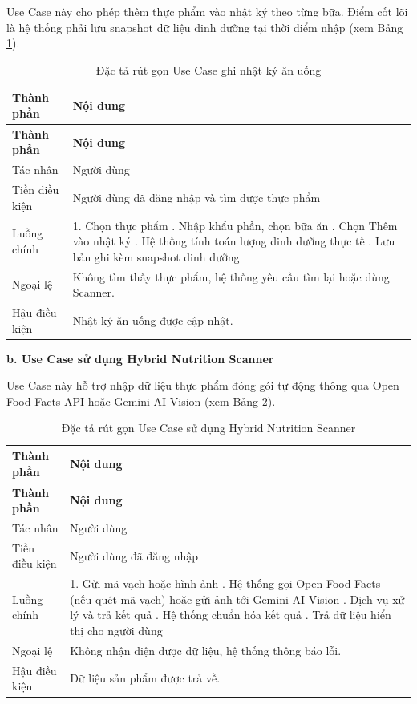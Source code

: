 \documentclass[12pt, a4paper]{report}
\begin{document}
Use Case này cho phép thêm thực phẩm vào nhật ký theo từng bữa. Điểm cốt lõi là hệ thống phải lưu snapshot dữ liệu dinh dưỡng tại thời điểm nhập (xem Bảng \ref{tab:uc_ghi_nhat_ky}).

\begin{longtable}{|>{\raggedright\arraybackslash}p{4cm}|p{11cm}|}
\caption{Đặc tả rút gọn Use Case ghi nhật ký ăn uống}
\label{tab:uc_ghi_nhat_ky} \\
\hline
\textbf{Thành phần} & \textbf{Nội dung} \\
\hline
\endfirsthead
\hline
\textbf{Thành phần} & \textbf{Nội dung} \\
\hline
\endhead

Tác nhân & Người dùng \\
\hline
Tiền điều kiện & Người dùng đã đăng nhập và tìm được thực phẩm \\
\hline
Luồng chính & 1. Chọn thực phẩm \newline 2. Nhập khẩu phần, chọn bữa ăn \newline 3. Chọn Thêm vào nhật ký \newline 4. Hệ thống tính toán lượng dinh dưỡng thực tế \newline 5. Lưu bản ghi kèm snapshot dinh dưỡng \\
\hline
Ngoại lệ & Không tìm thấy thực phẩm, hệ thống yêu cầu tìm lại hoặc dùng Scanner. \\
\hline
Hậu điều kiện & Nhật ký ăn uống được cập nhật. \\
\hline
\end{longtable}

\textbf{b. Use Case sử dụng Hybrid Nutrition Scanner}

Use Case này hỗ trợ nhập dữ liệu thực phẩm đóng gói tự động thông qua Open Food Facts API hoặc Gemini AI Vision (xem Bảng \ref{tab:uc_scanner}).

\begin{longtable}{|>{\raggedright\arraybackslash}p{4cm}|p{11cm}|}
\caption{Đặc tả rút gọn Use Case sử dụng Hybrid Nutrition Scanner}
\label{tab:uc_scanner} \\
\hline
\textbf{Thành phần} & \textbf{Nội dung} \\
\hline
\endfirsthead
\hline
\textbf{Thành phần} & \textbf{Nội dung} \\
\hline
\endhead

Tác nhân & Người dùng \\
\hline
Tiền điều kiện & Người dùng đã đăng nhập \\
\hline
Luồng chính & 1. Gửi mã vạch hoặc hình ảnh \newline 2. Hệ thống gọi Open Food Facts (nếu quét mã vạch) hoặc gửi ảnh tới Gemini AI Vision \newline 3. Dịch vụ xử lý và trả kết quả \newline 4. Hệ thống chuẩn hóa kết quả \newline 5. Trả dữ liệu hiển thị cho người dùng \\
\hline
Ngoại lệ & Không nhận diện được dữ liệu, hệ thống thông báo lỗi. \\
\hline
Hậu điều kiện & Dữ liệu sản phẩm được trả về. \\
\hline
\end{longtable}
\end{document}
